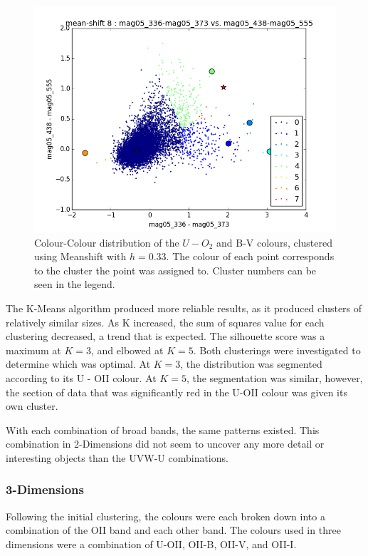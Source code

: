 \begin{figure}
\centering
\includegraphics[width=\linewidth]{figs/meanshift_color_8cl_mag05_336-mag05_373vsmag05_438-mag05_555}
\caption{Colour-Colour distribution of the $U-O_{2}$ and B-V colours, clustered using Meanshift with $h=0.33$. The colour of each point corresponds to the cluster the point was assigned to. Cluster numbers can be seen in the legend.}
\label{fig:UOIIMS}
\end{figure}

The K-Means algorithm produced more reliable results, as it produced clusters of relatively similar sizes.
As K increased, the sum of squares value for each clustering decreased, a trend that is expected.
The silhouette score was a maximum at $K=3$, and elbowed at $K=5$. Both clusterings were investigated to determine which was optimal.
At $K=3$, the distribution was segmented according to its U - OII colour.
At $K=5$, the segmentation was similar, however, the section of data that was significantly red in the U-OII colour was given its own cluster.

With each combination of broad bands, the same patterns existed.
This combination in 2-Dimensions did not seem to uncover any more detail or interesting objects than the UVW-U combinations.

\subsubsection{3-Dimensions}

Following the initial clustering, the colours were each broken down into a combination of the OII band and each other band.
The colours used in three dimensions were a combination of U-OII, OII-B, OII-V, and OII-I.

